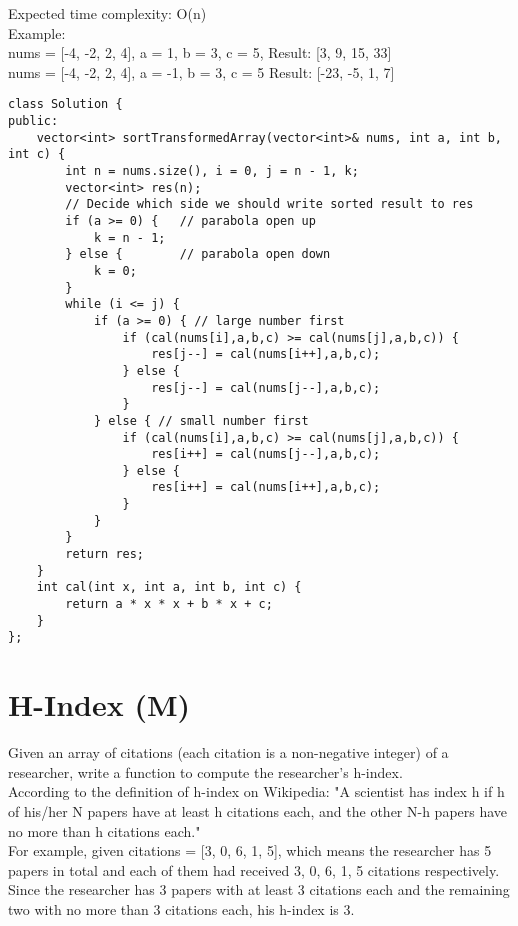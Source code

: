 Expected time complexity: O(n)\\

Example:\\
nums = [-4, -2, 2, 4], a = 1, b = 3, c = 5,
Result: [3, 9, 15, 33]\\
nums = [-4, -2, 2, 4], a = -1, b = 3, c = 5
Result: [-23, -5, 1, 7]\\

\begin{lstlisting}
class Solution {
public:
    vector<int> sortTransformedArray(vector<int>& nums, int a, int b, int c) {
        int n = nums.size(), i = 0, j = n - 1, k;
        vector<int> res(n);
        // Decide which side we should write sorted result to res
        if (a >= 0) {   // parabola open up
            k = n - 1;
        } else {        // parabola open down
            k = 0;
        }
        while (i <= j) {
            if (a >= 0) { // large number first
                if (cal(nums[i],a,b,c) >= cal(nums[j],a,b,c)) {
                    res[j--] = cal(nums[i++],a,b,c);
                } else {
                    res[j--] = cal(nums[j--],a,b,c);
                }
            } else { // small number first
                if (cal(nums[i],a,b,c) >= cal(nums[j],a,b,c)) {
                    res[i++] = cal(nums[j--],a,b,c);
                } else {
                    res[i++] = cal(nums[i++],a,b,c);
                }
            }
        }
        return res;
    }
    int cal(int x, int a, int b, int c) {
        return a * x * x + b * x + c;
    }
};
\end{lstlisting}


\section{H-Index (M)}
Given an array of citations (each citation is a non-negative integer) of a researcher, write a function to compute the researcher's h-index.\\

According to the definition of h-index on Wikipedia: "A scientist has index h if h of his/her N papers have at least h citations each, and the other N-h papers have no more than h citations each."\\

For example, given citations = [3, 0, 6, 1, 5], which means the researcher has 5 papers in total and each of them had received 3, 0, 6, 1, 5 citations respectively. Since the researcher has 3 papers with at least 3 citations each and the remaining two with no more than 3 citations each, his h-index is 3.\\

